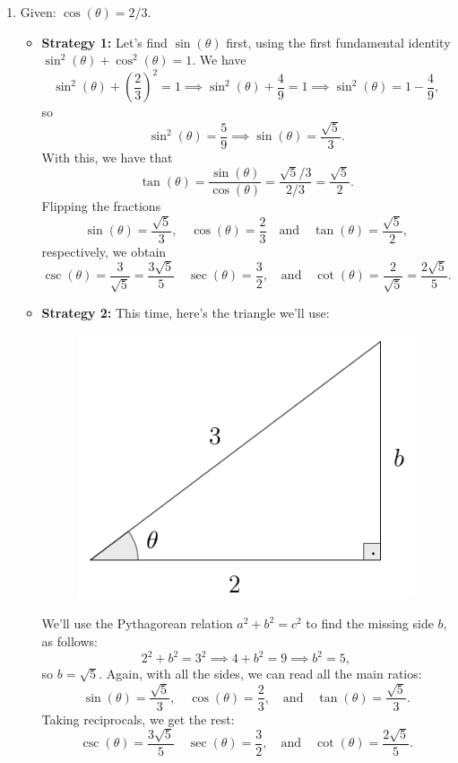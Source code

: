 \documentclass{ximera}
\begin{document}
\begin{example}
\begin{enumerate}[label=\alph*.]
  \item Given: $\cos(\theta) = 2/3$.

    \begin{explanation}
      \begin{itemize}
      \item {\bf Strategy 1:}       Let's find $\sin(\theta)$ first, using the first fundamental identity $\sin^2(\theta)+\cos^2(\theta)=1$. We have $$\sin^2(\theta) +\left(\frac{2}{3}\right)^2=1 \implies \sin^2(\theta)+\frac{4}{9}=1 \implies \sin^2(\theta) = 1-\frac{4}{9},$$so $$\sin^2(\theta) = \frac{5}{9} \implies \sin(\theta) = \frac{\sqrt{5}}{3}.$$ With this, we have that \[   \tan(\theta) = \frac{\sin(\theta)}{\cos(\theta)} = \frac{\sqrt{5}/3}{2/3} = \frac{\sqrt{5}}{2}.  \]Flipping the fractions $$\sin(\theta) = \frac{\sqrt{5}}{3}, \quad \cos(\theta) = \frac{2}{3} \quad\mbox{and}\quad \tan(\theta) = \frac{\sqrt{5}}{2},$$respectively, we obtain $$\csc(\theta) = \frac{3}{\sqrt{5}}  =\frac{3\sqrt{5}}{5} \quad \sec(\theta) = \frac{3}{2},\quad\mbox{and}\quad \cot(\theta) = \frac{2}{\sqrt{5}}=\frac{2\sqrt{5}}{5}.$$
      \item {\bf Strategy 2:} This time, here's the triangle we'll use: \begin{figure}[h]
          \centering
          \includegraphics[scale=.3]{./figures/9-1-3-triangle-cos-2-3.png}
        \end{figure} 
        We'll use the Pythagorean relation $a^2+b^2=c^2$ to find the missing side $b$, as follows: $$2^2+b^2=3^2\implies 4+b^2=9\implies b^2=5,$$so $b=\sqrt{5}$. Again, with all the sides, we can read all the main ratios: $$\sin(\theta) = \frac{\sqrt{5}}{3},\quad\cos(\theta)=\frac{2}{3},\quad\mbox{and}\quad\tan(\theta)=\frac{\sqrt{5}}{3}.$$Taking reciprocals, we get the rest:$$\csc(\theta) = \frac{3\sqrt{5}}{5} \quad \sec(\theta) = \frac{3}{2},\quad\mbox{and}\quad \cot(\theta)=\frac{2\sqrt{5}}{5}.$$
      \end{itemize}
    \end{explanation}
    

\end{enumerate}
\end{example}
\end{document}
